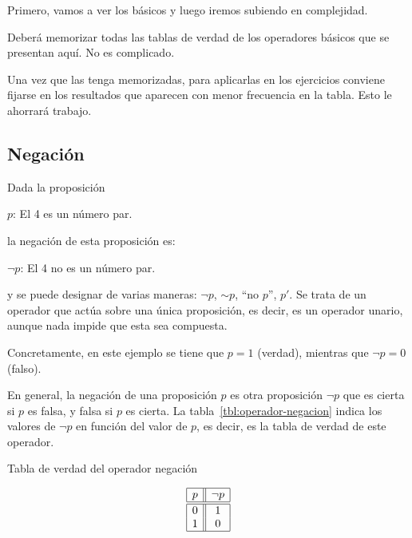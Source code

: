 


Primero, vamos a ver los básicos y luego iremos subiendo en complejidad.

Deberá memorizar todas las tablas de verdad de los operadores básicos que se
presentan aquí. No es complicado.

Una vez que las tenga memorizadas, para aplicarlas en los ejercicios
conviene fijarse en los resultados que aparecen con menor frecuencia en la
tabla. Esto le ahorrará trabajo.





\subsection{Negación}

Dada la proposición

\begin{center}
  $p$: El 4 es un número par.
\end{center}

\noindent la negación de esta proposición es:

\begin{center}
  $\neg p$: El 4 no es un número par.
\end{center}

\noindent y se puede designar de varias maneras: $\neg p$, ${\sim p}$, ``no
$p$'', $p'$. Se trata de un operador que actúa sobre una única proposición,
es decir, es un operador unario, aunque nada impide que esta sea compuesta.

Concretamente, en este ejemplo se tiene que $p = 1$ (verdad), mientras que
$\neg p = 0$ (falso).

En general, la negación de una proposición $p$ es otra proposición $\neg p$
que es cierta si $p$ es falsa, y falsa si $p$ es cierta. La
tabla~\ref{tbl:operador-negacion} indica los valores de $\neg p$ en función
del valor de $p$, es decir, es la tabla de verdad de este operador.

\begin{table}[h]%
  \caption{Tabla de verdad del operador negación}
  \label{tbl:operador-negacion}%
  \centering
  $$
    \begin{array}{|c||c|}
      \hline
      p & \neg p \\
      \hline
      \hline
      0 & 1 \\
      1 & 0 \\
      \hline
    \end{array}
  $$
\end{table}

